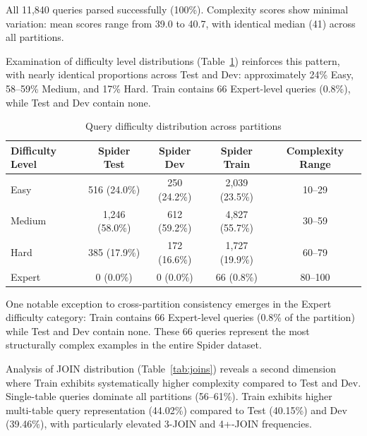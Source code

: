 \documentclass[print]{einformatica}
\begin{document}
All 11,840 queries parsed successfully (100\%). Complexity scores show minimal variation: mean scores range from 39.0 to 40.7, with identical median (41) across all partitions.

Examination of difficulty level distributions (Table~\ref{tab:difficulty}) reinforces this pattern, with nearly identical proportions across Test and Dev: approximately 24\% Easy, 58--59\% Medium, and 17\% Hard. Train contains 66 Expert-level queries (0.8\%), while Test and Dev contain none.

\begin{table}[ht]
    \caption{Query difficulty distribution across partitions}
    \label{tab:difficulty}
    \centering
    \footnotesize
    \begin{tabular}{lccc c}
        \toprule
        \textbf{Difficulty Level} & \textbf{Spider Test} & \textbf{Spider Dev} & \textbf{Spider Train} & \textbf{Complexity Range} \\
        \midrule
        Easy & 516 (24.0\%) & 250 (24.2\%) & 2,039 (23.5\%) & 10--29 \\
        Medium & 1,246 (58.0\%) & 612 (59.2\%) & 4,827 (55.7\%) & 30--59 \\
        Hard & 385 (17.9\%) & 172 (16.6\%) & 1,727 (19.9\%) & 60--79 \\
        Expert & 0 (0.0\%) & 0 (0.0\%) & 66 (0.8\%) & 80--100 \\
        \bottomrule
    \end{tabular}
\end{table}

One notable exception to cross-partition consistency emerges in the Expert difficulty category: Train contains 66 Expert-level queries (0.8\% of the partition) while Test and Dev contain none. These 66 queries represent the most structurally complex examples in the entire Spider dataset.

Analysis of JOIN distribution (Table~\ref{tab:joins}) reveals a second dimension where Train exhibits systematically higher complexity compared to Test and Dev. Single-table queries dominate all partitions (56--61\%). Train exhibits higher multi-table query representation (44.02\%) compared to Test (40.15\%) and Dev (39.46\%), with particularly elevated 3-JOIN and 4+-JOIN frequencies.
\end{document}
